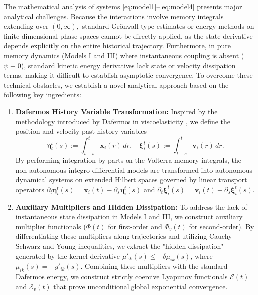 \documentclass[11pt]{amsart}
\numberwithin{equation}{section}
\begin{document}
The mathematical analysis of systems \eqref{eq:model1}--\eqref{eq:model4} presents major analytical challenges. Because the interactions involve memory integrals extending over $(0, \infty),$ standard Gr\"onwall-type estimates or energy methods on finite-dimensional phase spaces \cite{Ha2009, Cartabia} cannot be directly applied, as the state derivative depends explicitly on the entire historical trajectory. Furthermore, in pure memory dynamics (Models I and III) where instantaneous coupling is absent ($\psi \equiv 0$), standard kinetic energy derivatives lack state or velocity dissipation terms, making it difficult to establish asymptotic convergence. To overcome these technical obstacles, we establish a novel analytical approach based on the following key ingredients:
\begin{enumerate}
    \item [(i)] \textbf{Dafermos History Variable Transformation:} Inspired by the methodology introduced by Dafermos in viscoelasticity \cite{Dafermos1970}, we define the position and velocity past-history variables $$\boldsymbol{\eta}_i^t(s) := \int_{t-s}^t \boldsymbol{x}_i(r)\,dr, \quad \boldsymbol{\xi}_i^t(s) := \int_{t-s}^t \boldsymbol{v}_i(r)\,dr.$$
     By performing integration by parts on the Volterra memory integrals, the non-autonomous integro-differential models are transformed into autonomous dynamical systems on extended Hilbert spaces governed by linear transport operators $\partial_t \boldsymbol{\eta}_i^t(s) = \boldsymbol{x}_i(t) - \partial_s \boldsymbol{\eta}_i^t(s)$ and $\partial_t \boldsymbol{\xi}_i^t(s) = \boldsymbol{v}_i(t) - \partial_s \boldsymbol{\xi}_i^t(s)$.
    \item [(ii)] \textbf{Auxiliary Multipliers and Hidden Dissipation:} To address the lack of instantaneous state dissipation in Models I and III, we construct auxiliary multiplier functionals ($\Phi(t)$ for first-order and $\Phi_v(t)$ for second-order). By differentiating these multipliers along trajectories and utilizing Cauchy--Schwarz and Young inequalities, we extract the "hidden dissipation" generated by the kernel derivative $\mu'_{ik}(s) \le -\delta \mu_{ik}(s)$, where $\mu_{ik}(s) = -g'_{ik}(s)$. Combining these multipliers with the standard Dafermos energy, we construct strictly coercive Lyapunov functionals $\mathcal{E}(t)$ and $\mathcal{E}_v(t)$ that prove unconditional global exponential convergence.

\end{enumerate}
\end{document}
